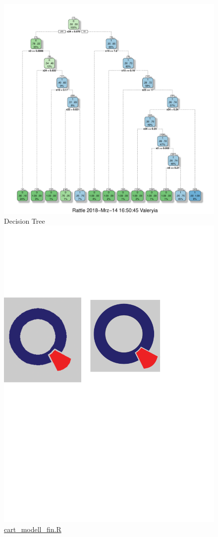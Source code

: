 \documentclass{article}
\begin{document}
\begin{figure}
\caption{Decision Tree \protect\includegraphics[scale=0.05]{qletlogo.pdf} {\href{https://github.com/thsis/SPL_WS1718/blob/master/CART/cart_modell_fin.R}{cart\_modell\_fin.R}}}
\includegraphics[scale=0.8, trim={0mm 10mm 0mm 0mm}, clip]{../CART/fancyRpartPlot.pdf}
\end{figure}
\end{document}
